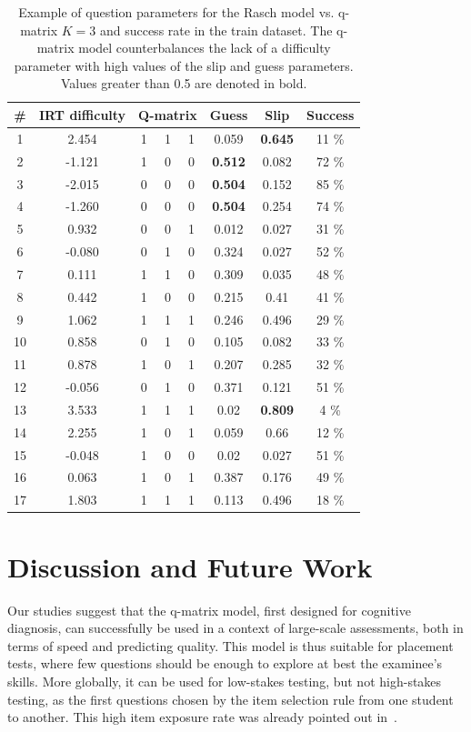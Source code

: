 \documentclass{sig-alternate}
\begin{document}
\begin{table}
\small\centering\begin{tabular}{c|c|ccccc|c}
\# & IRT difficulty & 	\multicolumn{3}{c}{Q-matrix} & Guess & Slip & Success\\
\hline
1 & 2.454 & 	1 & 1 & 1 & 0.059 & \textbf{0.645} & 11 \% \\
2 & -1.121 & 	1 & 0 & 0 & \textbf{0.512} & 0.082 & 72 \% \\
3 & -2.015 & 	0 & 0 & 0 & \textbf{0.504} & 0.152 & 85 \% \\
4 & -1.260 & 	0 & 0 & 0 & \textbf{0.504} & 0.254 & 74 \% \\
5 & 0.932 & 	0 & 0 & 1 & 0.012 & 0.027 & 31 \% \\
6 & -0.080 & 	0 & 1 & 0 & 0.324 & 0.027 & 52 \% \\
7 & 0.111 & 	1 & 1 & 0 & 0.309 & 0.035 & 48 \% \\
8 & 0.442 & 	1 & 0 & 0 & 0.215 & 0.41 & 41 \% \\
9 & 1.062 & 	1 & 1 & 1 & 0.246 & 0.496 & 29 \% \\
10 & 0.858 & 	0 & 1 & 0 & 0.105 & 0.082 & 33 \% \\
11 & 0.878 & 	1 & 0 & 1 & 0.207 & 0.285 & 32 \% \\
12 & -0.056 & 	0 & 1 & 0 & 0.371 & 0.121 & 51 \% \\
13 & 3.533 & 	1 & 1 & 1 & 0.02 & \textbf{0.809} & 4 \% \\
14 & 2.255 & 	1 & 0 & 1 & 0.059 & 0.66 & 12 \% \\
15 & -0.048 & 	1 & 0 & 0 & 0.02 & 0.027 & 51 \% \\
16 & 0.063 & 	1 & 0 & 1 & 0.387 & 0.176 & 49 \% \\
17 & 1.803 & 	1 & 1 & 1 & 0.113 & 0.496 & 18 \%
\end{tabular}
\caption{Example of question parameters for the Rasch model vs. q-matrix $K = 3$ and success rate in the train dataset. The q-matrix model counterbalances the lack of a difficulty parameter with high values of the slip and guess parameters. Values greater than 0.5 are denoted in bold.}
\label{tab:example}
\end{table}

\section{Discussion and Future Work}

Our studies suggest that the q-matrix model, first designed for cognitive diagnosis, can successfully be used in a context of large-scale assessments, both in terms of speed and predicting quality. This model is thus suitable for placement tests, where few questions should be enough to explore at best the examinee's skills. More globally, it can be used for low-stakes testing, but not high-stakes testing, as the first questions chosen by the item selection rule from one student to another. This high item exposure rate was already pointed out in~\cite{Cheng2009}.
\end{document}
